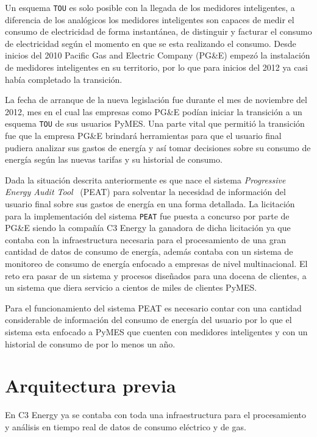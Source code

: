 Un esquema \texttt{TOU} es solo posible con la llegada de los medidores
inteligentes, a diferencia de los analógicos los medidores inteligentes
son capaces de medir el consumo de electricidad de forma instantánea,
de distinguir y facturar el consumo de electricidad según el momento en que se
esta realizando el consumo. Desde inicios del 2010 Pacific Gas and
Electric Company (PG\&E) empezó la instalación de medidores inteligentes
en su territorio, por lo que para inicios del 2012 ya casi había
completado la transición.

La fecha de arranque de la nueva legislación fue durante el mes de noviembre
del 2012, mes en el cual las empresas como PG\&E podían iniciar la transición
a un esquema \texttt{TOU} de sus usuarios PyMES.
Una parte vital que permitió la transición fue que la empresa PG\&E brindará
herramientas para que el usuario final pudiera analizar sus gastos de energía
y así tomar decisiones sobre su consumo de energía según las nuevas tarifas
y su historial de consumo.

Dada la situación descrita anteriormente es que nace el sistema
\textit{Progressive Energy Audit Tool} \ (PEAT) para solventar la necesidad
de información del usuario final sobre sus gastos de energía en una forma detallada.
La licitación para la implementación del sistema \texttt{PEAT} fue puesta
a concurso por parte de PG\&E siendo la compañía C3 Energy la ganadora de dicha
licitación  ya que contaba con la infraestructura necesaria para el
procesamiento de una gran cantidad de datos de consumo de energía,
además contaba con un sistema de monitoreo de consumo de energía enfocado
a empresas de nivel multinacional. El reto era pasar de un sistema y procesos
diseñados para una docena de clientes, a un sistema que diera servicio a
cientos de miles de clientes PyMES.

Para el funcionamiento del sistema PEAT es necesario contar con una cantidad
considerable de información del consumo de energía del usuario por lo que
el sistema esta enfocado a PyMES que cuenten con medidores inteligentes y
con un historial de consumo de por lo menos un año.

\section{Arquitectura previa}
En C3 Energy ya se contaba con toda una infraestructura para el
procesamiento y análisis en tiempo real de datos de consumo eléctrico
y de gas.

\vspace{2.5mm}


